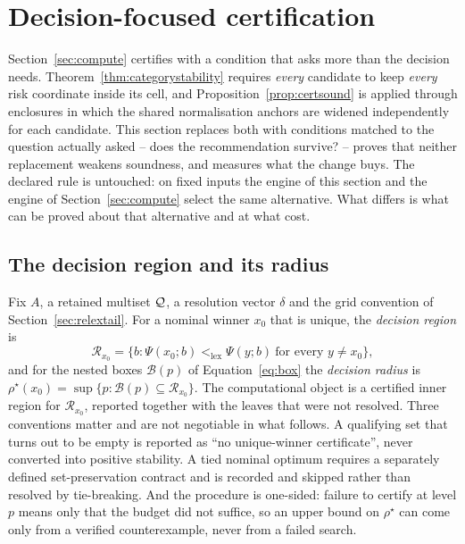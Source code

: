 \section{Decision-focused certification}
\label{sec:certrelex}

Section~\ref{sec:compute} certifies with a condition that asks more than the
decision needs. Theorem~\ref{thm:categorystability} requires \emph{every}
candidate to keep \emph{every} risk coordinate inside its cell, and
Proposition~\ref{prop:certsound} is applied through enclosures in which the
shared normalisation anchors are widened independently for each candidate. This
section replaces both with conditions matched to the question actually asked --
does the recommendation survive? -- proves that neither replacement weakens
soundness, and measures what the change buys. The declared rule is untouched:
on fixed inputs the engine of this section and the engine of
Section~\ref{sec:compute} select the same alternative. What differs is what can
be proved about that alternative and at what cost.

\subsection{The decision region and its radius}
Fix $A$, a retained multiset $\mathcal Q$, a resolution vector $\delta$ and the grid
convention of Section~\ref{sec:relextail}. For a nominal winner $x_0$ that is
unique, the \emph{decision region} is
\begin{equation}
\mathcal R_{x_0}=\bigl\{b:\Psi(x_0;b)<_{\mathrm{lex}}\Psi(y;b)\ \text{for every }y\neq x_0\bigr\},
\label{eq:decisionregion}
\end{equation}
and for the nested boxes $\mathcal B(p)$ of Equation~\eqref{eq:box} the
\emph{decision radius} is
$\rho^\star(x_0)=\sup\{p:\mathcal B(p)\subseteq\mathcal R_{x_0}\}$.
The computational object is a certified inner region for
$\mathcal R_{x_0}$, reported together with the leaves that were not resolved.
Three conventions matter and are not negotiable in what follows. A qualifying
set that turns out to be empty is reported as ``no unique-winner certificate'',
never converted into positive stability. A tied nominal optimum requires a
separately defined set-preservation contract and is recorded and skipped rather
than resolved by tie-breaking. And the procedure is one-sided: failure to
certify at level $p$ means only that the budget did not suffice, so an upper
bound on $\rho^\star$ can come only from a verified counterexample, never from
a failed search.

